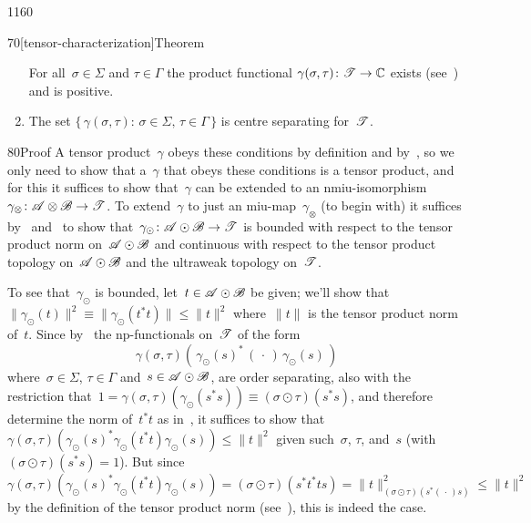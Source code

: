 \begin{parsec}{1160}
\begin{point}{70}[tensor-characterization]{Theorem}
\begin{enumerate}
For all~$\sigma\in \Sigma$ and $\tau\in\Gamma$
the product functional $\gamma(\sigma,\tau)\colon \mathscr{T}\to\mathbb{C}$
exists
(see~)
 and is positive.
\item
The set
$\{\,\gamma(\sigma,\tau)\colon\,\sigma\in\Sigma,\,\tau\in \Gamma\,\}$
is centre separating for~$\mathscr{T}$.
\end{enumerate}
\spacingfix%
\begin{point}{80}{Proof}%
A tensor product~$\gamma$
obeys these conditions
by definition and by~,
so we only need to show that
a~$\gamma$ that obeys these conditions is a tensor product,
and for this it
suffices to show that~$\gamma$ can be extended
to an nmiu-isomorphism $\gamma_\otimes \colon \mathscr{A}\otimes\mathscr{B}\to \mathscr{T}$.
To extend~$\gamma$ to just an miu-map~$\gamma_\otimes$
(to begin with)
it suffices by~
and~ 
to show that~$\gamma_\odot\colon \mathscr{A}\odot\mathscr{B}\to\mathscr{T}$
is bounded with respect to the tensor product norm
on~$\mathscr{A}\odot\mathscr{B}$
and continuous with respect to the tensor product
topology on~$\mathscr{A}\odot \mathscr{B}$ and the ultraweak topology on~$\mathscr{T}$.

To see that~$\gamma_\odot$
is bounded, 
let~$t\in \mathscr{A}\odot\mathscr{B}$ be given;
we'll show
that~$\|\gamma_\odot(t)\|^2
\equiv \|\gamma_\odot(t^*t)\|\leq \|t\|^2$
where~$\|t\|$ is the tensor product norm of~$t$.
Since by~
the np-functionals on~$\mathscr{T}$
of the form
\begin{equation}
	\label{tensor-characterization-1}	
	\gamma(\sigma,\tau)(\,\gamma_\odot(s)^*\,
(\,\cdot\,)\,\gamma_\odot(s)\,)
\end{equation}
where~$\sigma\in\Sigma$, $\tau\in\Gamma$
and~$s\in\mathscr{A}\odot\mathscr{B}$,
are order separating,
also with  the restriction
that~$1=\gamma(\sigma,\tau)(\gamma_\odot(s^*s))\equiv
(\sigma\odot\tau)(s^*s)$,
and therefore determine the norm of~$t^*t$ as in~,
it suffices to show that
$\gamma(\sigma,\tau)(\gamma_\odot(s)^* \gamma_\odot(t^*t)
\gamma_\odot(s)) \leq \|t\|^2$
given such~$\sigma$, $\tau$, and~$s$
(with $(\sigma\odot \tau)(s^*s)=1$).
But since $
\gamma(\sigma,\tau)(\gamma_\odot(s)^* \gamma_\odot(t^*t)\gamma_\odot(s)) =
(\sigma\odot\tau)(s^* t^*t s)
= \|t\|_{(\sigma\odot\tau)(s^*(\,\cdot\,)s)}^2
\leq \|t\|^2$
by the definition of the tensor product norm
(see~),
this is indeed the case.


\end{point}
\end{point}
\end{parsec}
